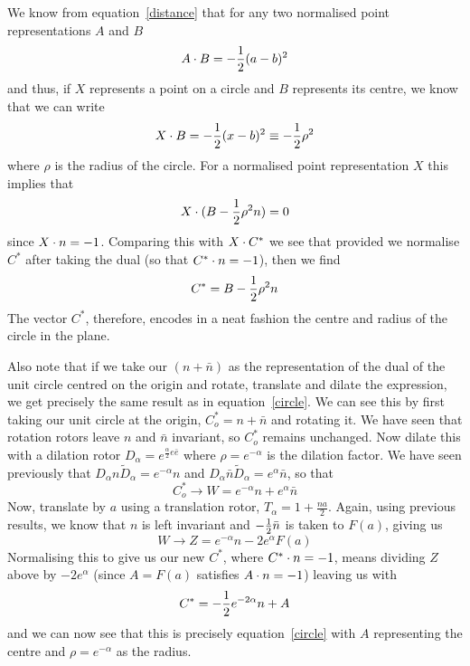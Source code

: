 We know from equation~\ref{distance} that for any two normalised
point representations $A$ and $B$
%
\begin{equation}
A\cdot B =  -\frac{1}{2}(a-b)^2 \nonumber
\end{equation}
%
and thus, if $X$ represents a point on a circle and $B$ represents its centre,
we know that we can write
%
\[  X\cdot B = -\frac{1}{2}(x-b)^2 \equiv -\frac{1}{2}\rho^2  \]
%
where $\rho$ is the radius of the circle. For a
normalised point representation $X$ this implies that
%
\[ X\cdot (B - \frac{1}{2}\rho^2n) =0 \]
%
since $X\cdot n = -1$. Comparing this with $X\cdot C^*$ we see that
provided we normalise $C^*$ after taking the dual (so that $C^*\cdot
n=-1$), then we find
%
\begin{equation}
   C^* = B - \frac{1}{2}\rho^2 n
   \label{circle}
   \end{equation}
%
The vector $C^*$, therefore, encodes in a neat fashion
the centre and radius of the circle in the plane.  

Also note that if we take our $(n+\bar{n})$ as the
representation of the dual of the unit circle centred on the
origin and rotate, translate and dilate the expression,
we get precisely the same result as in
equation~\ref{circle}. We can see this by first
taking our unit circle at the origin, $C_o^*=n+\bar{n}$ and
rotating it. We have seen that rotation rotors leave $n$
and $\bar{n}$ invariant, so $C_o^*$ remains unchanged.
Now dilate this with a dilation rotor
$D_{\alpha}=e^{\frac{\alpha}{2}e\bar{e}}$ where
$\rho=e^{-\alpha}$ is the dilation factor. We have seen
previously that
$D_{\alpha}n\tilde{D}_{\alpha}=e^{-\alpha}n$ and
$D_{\alpha}\bar{n}\tilde{D}_{\alpha}=e^{\alpha}\bar{n}$,
so that
%
\begin{equation}
C_o^* \rightarrow  W = e^{-\alpha}n + e^{\alpha}\bar{n}
\end{equation}
%
Now, translate by $a$ using a translation rotor,
$T_{\alpha}=1+\frac{na}{2}$. Again, using previous results, we
know that $n$ is left invariant and $-\frac{1}{2} \bar{n}$ is taken to
$F(a)$, giving us
%
\begin{equation}
W \rightarrow  Z = e^{-\alpha}n -2e^{\alpha}F(a)
\end{equation}
%
Normalising this to give us our new $C^*$, where $C^*\cdot
n=-1$, means dividing $Z$ above by $-2e^{\alpha}$ (since
$A=F(a)$ satisfies $A\cdot n=-1$) leaving us with
%
\begin{equation}
C^* =  -\frac{1}{2} e^{-2\alpha}n + A
\end{equation}
%
and we can now see that this is precisely equation~\ref{circle}
with $A$ representing the centre and $\rho=e^{-\alpha}$ as the radius.

